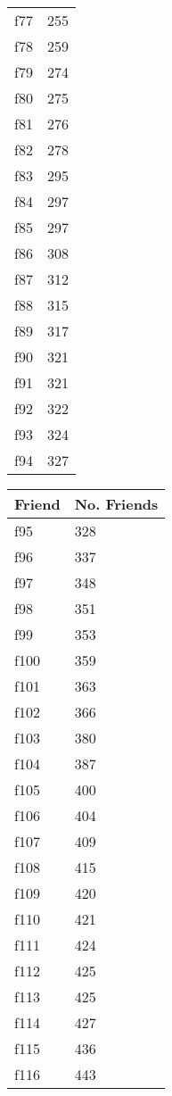 \begin{table}[!htbp]
\begin{center}
\begin{minipage}{0.22\textwidth}
\begin{tabular}{|l | l|}
			f77 & 255\\
			f78 & 259\\
			f79 & 274\\
			f80 & 275\\
			f81 & 276\\
			f82 & 278\\
			f83 & 295\\
			f84 & 297\\
			f85 & 297\\
			f86 & 308\\
			f87 & 312\\
			f88 & 315\\
			f89 & 317\\
			f90 & 321\\
			f91 & 321\\
			f92 & 322\\
			f93 & 324\\
			f94 & 327\\
			\hline
		\end{tabular}
	\end{minipage}
	\begin{minipage}{0.22\textwidth}
		\begin{tabular}{|l | l|}
			\hline
			\multicolumn{1}{|c|}{Friend} & \multicolumn{1}{c|}{No. Friends}\\
			\hline
			f95 & 328\\
			f96 & 337\\
			f97 & 348\\
			f98 & 351\\
			f99 & 353\\
			f100 & 359\\
			f101 & 363\\
			f102 & 366\\
			f103 & 380\\
			f104 & 387\\
			f105 & 400\\
			f106 & 404\\
			f107 & 409\\
			f108 & 415\\
			f109 & 420\\
			f110 & 421\\
			f111 & 424\\
			f112 & 425\\
			f113 & 425\\
			f114 & 427\\
			f115 & 436\\
			f116 & 443\\

\end{tabular}
\end{minipage}
\end{center}
\end{table}
